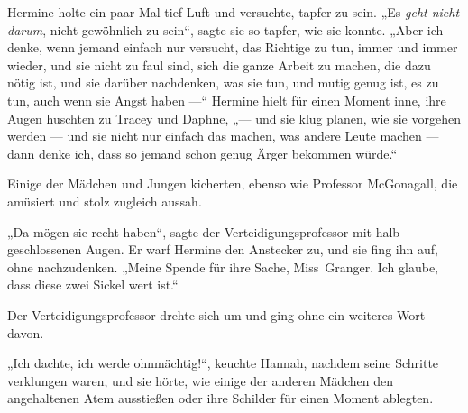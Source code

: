 Hermine holte ein paar Mal tief Luft und versuchte, tapfer zu sein.
„Es \emph{geht nicht darum}, nicht gewöhnlich zu sein“, sagte sie so tapfer, wie sie konnte.
„Aber ich denke, wenn jemand einfach nur versucht, das Richtige zu tun, immer und immer wieder, und sie nicht zu faul sind, sich die ganze Arbeit zu machen, die dazu nötig ist, und sie darüber nachdenken, was sie tun, und mutig genug ist, es zu tun, auch wenn sie Angst haben —“ Hermine hielt für einen Moment inne, ihre Augen huschten zu Tracey und Daphne, „— und sie klug planen, wie sie vorgehen werden — und sie nicht nur einfach das machen, was andere Leute machen — dann denke ich, dass so jemand schon genug Ärger bekommen würde.“

Einige der Mädchen und Jungen kicherten, ebenso wie Professor McGonagall, die amüsiert und stolz zugleich aussah.

„Da mögen sie recht haben“, sagte der Verteidigungsprofessor mit halb geschlossenen Augen. Er warf Hermine den Anstecker zu, und sie fing ihn auf, ohne nachzudenken.
„Meine Spende für ihre Sache, Miss~Granger. Ich glaube, dass diese zwei Sickel wert ist.“

Der Verteidigungsprofessor drehte sich um und ging ohne ein weiteres Wort davon.

„Ich dachte, ich werde ohnmächtig!“, keuchte Hannah, nachdem seine Schritte verklungen waren, und sie hörte, wie einige der anderen Mädchen den angehaltenen Atem ausstießen oder ihre Schilder für einen Moment ablegten.

